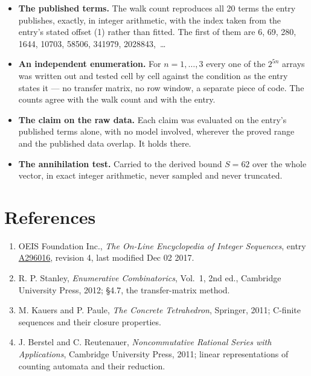 \documentclass[11pt]{article}
\theoremstyle{definition}
\begin{document}
\begin{itemize}

\item {\bfseries The published terms.} The walk count reproduces all 20 terms the entry publishes, exactly, in integer arithmetic, with the index taken from the entry's stated offset (1) rather than fitted. The first of them are 6, 69, 280, 1644, 10703, 58506, 341979, 2028843,~\dots

\item {\bfseries An independent enumeration.} For $n = 1,\dots,3$ every one of the $2^{5n}$ arrays was written out and tested cell by cell against the condition as the entry states it --- no transfer matrix, no row window, a separate piece of code. The counts agree with the walk count and with the entry.

\item {\bfseries The claim on the raw data.} Each claim was evaluated on the entry's published terms alone, with no model involved, wherever the proved range and the published data overlap. It holds there.

\item {\bfseries The annihilation test.} Carried to the derived bound $S = 62$ over the whole vector, in exact integer arithmetic, never sampled and never truncated.

\end{itemize}

\section{References}

\begin{enumerate}

\item OEIS Foundation Inc., \emph{The On-Line Encyclopedia of Integer Sequences}, entry \href{https://oeis.org/A296016}{A296016}, revision 4, last modified Dec 02 2017.

\item R. P. Stanley, \emph{Enumerative Combinatorics}, Vol.~1, 2nd ed., Cambridge University Press, 2012; \S4.7, the transfer-matrix method.

\item M. Kauers and P. Paule, \emph{The Concrete Tetrahedron}, Springer, 2011; C-finite sequences and their closure properties.

\item J. Berstel and C. Reutenauer, \emph{Noncommutative Rational Series with Applications}, Cambridge University Press, 2011; linear representations of counting automata and their reduction.

\end{enumerate}
\end{document}
